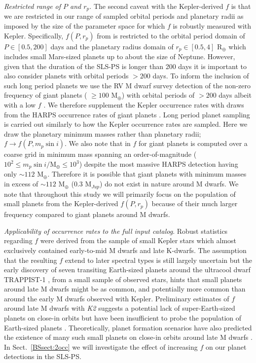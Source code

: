 \emph{Restricted range of $P$ and $r_p$}. The second caveat with the Kepler-derived $f$ is that
we are restricted in
our range of sampled orbital periods and planetary radii as imposed by the size of the parameter space
for which $f$ is robustly measured with Kepler. Specifically, $f(P,r_p)$ from \cite{dressing15a}
is restricted to the orbital period domain of $P \in [0.5,200]$ days and the planetary radius domain of 
$r_p \in [0.5,4]$ R$_{\oplus}$ which includes small Mars-sized planets up to about the size of Neptune. 
However, given that the duration of the SLS-PS is longer than 200 days it is important to also consider planets
with orbital periods $> 200$ days. To inform the inclusion of such long period planets we use the RV M dwarf
survey detection of the non-zero frequency of giant planets 
(\msini{} $\ge 100$ M$_{\oplus}$) with orbital 
periods of $>200$ days albeit with a low $f$ \citep[$\lesssim 5$\%;][]{bonfils13}.
We therefore supplement the Kepler occurrence rates with draws 
from the HARPS occurrence rates of giant planets \citep{bonfils13}.
Long period planet sampling is carried out similarly to how the Kepler occurrence rates are sampled.
Here we draw the planetary minimum masses rather than planetary radii; $f \to f(P,m_p\sin{i})$.
We also note that in \cite{bonfils13} $f$ for giant planets is computed over a coarse grid
in minimum mass spanning an order-of-magnitude 
($10^2 \le m_p\sin{i}/\text{M}_{\oplus} \le 10^3$) despite the most massive HARPS detection having only
\msini{} $\sim 112$ M$_{\oplus}$. Therefore it is possible that giant planets with minimum masses in excess
of $\sim 112$ M$_{\oplus}$ ($0.3$ M$_{Jup}$) do not exist in nature around M dwarfs.
We note that throughout this study we will
primarily focus on the population of small planets from the Kepler-derived $f(P,r_p)$ 
because of their much larger frequency compared to giant planets around M dwarfs.

\emph{Applicability of occurrence rates to the full input catalog}.
Robust statistics regarding $f$ were derived from the 
sample of small Kepler stars which almost exclusively contained early-to-mid M dwarfs and late K-dwarfs.
The assumption that the resulting $f$ extend to later spectral
types is still largely uncertain but the early discovery of seven transiting Earth-sized planets around the
ultracool dwarf TRAPPIST-1 \citep{gillon17}, from a small sample of observed stars, hints that small planets
around late M dwarfs might be as common, and potentially more common than around the early M dwarfs observed
with Kepler. Preliminary estimates of $f$ around
late M dwarfs with \emph{K2} suggests a potential lack of super-Earth-sized planets on close-in orbits but have
been insufficient to probe the population of Earth-sized planets \citep{demory16}. Theoretically,
planet formation scenarios have also predicted the existence of many such small planets on close-in orbits
around late M dwarfs \citep[e.g.][]{alibert13,alibert17}. In Sect.~\ref{BSsect:2occ} we will investigate the
effect of increasing $f$ on our planet detections in the SLS-PS.

